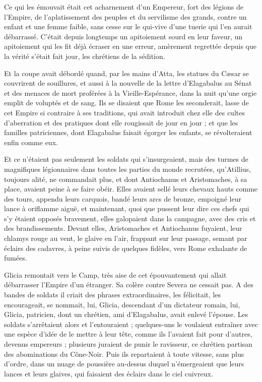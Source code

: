 \documentclass[a4paper, 11pt, oneside, polutonikogreek, french]{article}
\begin{document}
Ce qui les émouvait était cet acharnement d'un Empereur, fort des légions de l'Empire, de l'aplatissement des peuples et du servilisme des grands, contre un enfant et une femme faible, sans cesse sur le qui-vive d'une tuerie qui l'en aurait débarrassé. C'était depuis longtemps un apitoiement sourd en leur faveur, un apitoiement qui les fit déjà écraser en une erreur, amèrement regrettée depuis que la vérité s'était fait jour, les chrétiens de la sédition.

Et la coupe avait débordé quand, par les mains d'Atta, les statues du Cæsar se couvrirent de souillures, et aussi à la nouvelle de la lettre d'Elagabalus au Sénat et des menaces de mort proférées à la Vieille-Espérance, dans la nuit qu'une orgie emplit de voluptés et de sang. Ils se disaient que Rome les seconderait, lasse de cet Empire si contraire à ses traditions, qui avait introduit chez elle des cultes d'aberration et des pratiques dont elle rougissait de jour en jour ; et que les familles patriciennes, dont Elagabalus faisait égorger les enfants, se révolteraient enfin comme eux.

Et ce n'étaient pas seulement les soldats qui s'insurgeaient, mais des turmes de magnifiques légionnaires dans toutes les parties du monde recrutées, qu'Atillius, toujours alité, ne commandait plus, et dont Antiochanus et Aristomaches, à sa place, avaient peine à se faire obéir. Elles avaient sellé leurs chevaux hauts comme des tours, appendu leurs carquois, bandé leurs arcs de bronze, empoigné leur lance à oriflamme aiguë, et maintenant, quoi que pussent leur dire ces chefs qui s'y étaient opposés bravement, elles galopaient dans la campagne, avec des cris et des brandissements. Devant elles, Aristomaches et Antiochanus fuyaient, leur chlamys rouge au vent, le glaive en l'air, frappant sur leur passage, semant par éclairs des cadavres, à peine suivis de quelques fidèles, vers Rome exhalante de fumées.

Glicia remontait vers le Camp, très aise de cet épouvantement qui allait débarrasser l'Empire d'un étranger. Sa colère contre Severa ne cessait pas. A des bandes de soldats il criait des phrases extraordinaires, les félicitait, les encourageait, se nommait, lui, Glicia, descendant d'un dictateur romain, lui, Glicia, patricien, dont un chrétien, ami d'Elagabalus, avait enlevé l'épouse. Les soldats s'arrêtaient alors et l'entouraient ; quelques-uns le voulaient entraîner avec une espèce d'idée de le mettre à leur tête, comme ils l'avaient fait pour d'autres, devenus empereurs ; plusieurs juraient de punir le ravisseur, ce chrétien partisan des abominations du Cône-Noir. Puis ils repartaient à toute vitesse, sans plus d'ordre, dans un nuage de poussière au-dessus duquel n'émergeaient que leurs lances et leurs glaives, qui faisaient des éclairs dans le ciel cuivreux.
\end{document}
